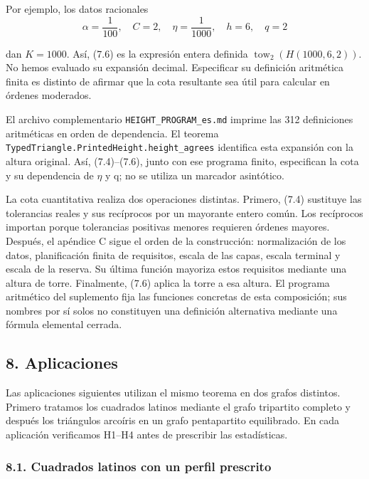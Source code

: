 \documentclass[spanish,11pt,a4paper]{article}
\begin{document}
Por ejemplo, los datos racionales
\[\alpha=\frac1{100},\quad C=2,\quad\eta=\frac1{1000},
\quad h=6,\quad q=2\]

dan \(K=1000\). Así, (7.6) es la expresión entera definida \(\operatorname{tow}_2(H(1000,6,2))\). No hemos evaluado su expansión decimal. Especificar su definición aritmética finita es distinto de afirmar que la cota resultante sea útil para calcular en órdenes moderados.

El archivo complementario \texttt{HEIGHT\_\allowbreak{}PROGRAM\_\allowbreak{}es.\allowbreak{}md} imprime las 312 definiciones aritméticas en orden de dependencia. El teorema \texttt{Typed\allowbreak{}Triangle.\allowbreak{}Printed\allowbreak{}Height.\allowbreak{}height\_\allowbreak{}agrees} identifica esta expansión con la altura original. Así, (7.4)--(7.6), junto con ese programa finito, especifican la cota y su dependencia de \(\eta\) y q; no se utiliza un marcador asintótico.

La cota cuantitativa realiza dos operaciones distintas. Primero, (7.4) sustituye las tolerancias reales y sus recíprocos por un mayorante entero común. Los recíprocos importan porque tolerancias positivas menores requieren órdenes mayores. Después, el apéndice C sigue el orden de la construcción: normalización de los datos, planificación finita de requisitos, escala de las capas, escala terminal y escala de la reserva. Su última función mayoriza estos requisitos mediante una altura de torre. Finalmente, (7.6) aplica la torre a esa altura. El programa aritmético del suplemento fija las funciones concretas de esta composición; sus nombres por sí solos no constituyen una definición alternativa mediante una fórmula elemental cerrada.

\subsection{8. Aplicaciones}\label{aplicaciones}

Las aplicaciones siguientes utilizan el mismo teorema en dos grafos distintos. Primero tratamos los cuadrados latinos mediante el grafo tripartito completo y después los triángulos arcoíris en un grafo pentapartito equilibrado. En cada aplicación verificamos H1--H4 antes de prescribir las estadísticas.

\subsubsection{8.1. Cuadrados latinos con un perfil prescrito}\label{cuadrados-latinos-con-un-perfil-prescrito}
\end{document}
